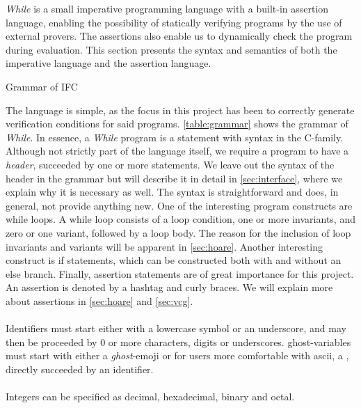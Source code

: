 \textit{While} is a small imperative programming language with a built-in assertion language, enabling the possibility of statically verifying programs by the use of external provers.
The assertions also enable us to dynamically check the program during evaluation.
This section presents the syntax and semantics of both the imperative language and the assertion language.


\begin{table}[h!]

\caption{Grammar of IFC}
\label{table:grammar}
\end{table}

The language is simple, as the focus in this project has been to correctly generate verification conditions for said programs.
\cref{table:grammar} shows the grammar of \textit{While}.
In essence, a \textit{While} program is a statement with syntax in the C-family.
Although not strictly part of the language itself, we require a program to have a \textit{header}, succeeded by one or more statements.
We leave out the syntax of the header in the grammar but will describe it in detail in \cref{sec:interface}, where we explain why it is necessary as well.
The syntax is straightforward and does, in general, not provide anything new.
One of the interesting program constructs are while loops. A while loop consists of a loop condition, one or more invariants, and zero or one variant, followed by a loop body. The reason for the inclusion of loop invariants and variants will be apparent in \cref{sec:hoare}.
Another interesting construct is if statements, which can be constructed both with and without an else branch.
Finally, assertion statements are of great importance for this project. An assertion is denoted by a hashtag and curly braces. We will explain more about assertions in \cref{sec:hoare} and \cref{sec:vcg}.
\\~\\
Identifiers must start either with a lowercase symbol or an underscore, and may then be proceeded by 0 or more characters, digits or underscores.
ghost-variables must start with either a \textit{ghost}-emoji or for users more comfortable with ascii, a \textdollar, directly succeeded by an identifier.
\\~\\
Integers can be specified as decimal, hexadecimal, binary and octal.
